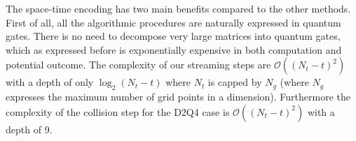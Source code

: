 The space-time encoding has two main benefits compared to the other methods. First of all, all the algorithmic procedures are naturally expressed in quantum gates. There is no need to decompose very large matrices into quantum gates, which as expressed before is exponentially expensive in both computation and potential outcome. The complexity of our streaming steps are $\mathcal{O} \left ( \left ( N_t - t \right )^2  \right )$ with a depth of only $\log_2 \left (N_t -t \right)$ where $N_t$ is capped by $N_g$ (where $N_g$ expresses the maximum number of grid points in a dimension). Furthermore the complexity of the collision step for the D2Q4 case is $\mathcal{O} \left ( \left ( N_t - t \right )^2  \right )$ with a depth of $9$.

